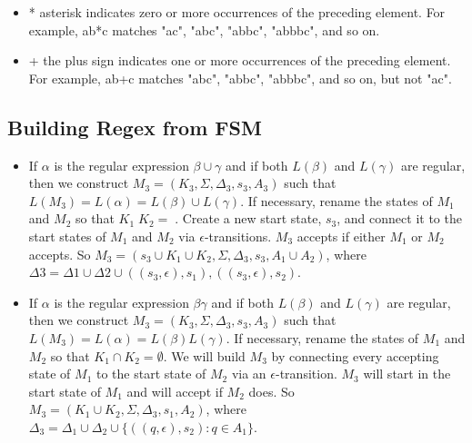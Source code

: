 \documentclass[hidelinks,12pt]{article}
\begin{document}
\begin{itemize}
    \item * asterisk indicates zero or more occurrences of the preceding element.
        For example, ab*c matches "ac", "abc", "abbc", "abbbc", and so on. 
    \item + the plus sign indicates one or more occurrences of the preceding element.
        For example, ab+c matches "abc", "abbc", "abbbc", and so on, but not "ac". 
\end{itemize}


\subsection{Building Regex from FSM}

\begin{itemize}

    \item If $\alpha$ is the regular expression $\beta \cup \gamma$ and if both $L(\beta)$ and $L(\gamma)$ are regular,
        then we construct $M_3 = (K_3, \Sigma, \Delta_3, s_3, A_3)$ such that $L(M_3) = L(\alpha) = L(\beta) \cup L(\gamma)$. If necessary, rename the states of $M_1$ and $M_2$ so that $K_1  K_2 = $. Create
        a new start state, $s_3$, and connect it to the start states of $M_1$ and $M_2$ via
        $\epsilon$-transitions. $M_3$ accepts if either $M_1$ or $M_2$ accepts. So $M_3 = ({s_3} \cup K_1 \cup K_2, \Sigma, \Delta_3, s_3, A_1 \cup A_2)$, where $\Delta3 = \Delta1 \cup \Delta2 \cup {((s_3, \epsilon), s_1), ((s_3, \epsilon), s_2)}$.

    \item If $\alpha$ is the regular expression $\beta\gamma$ and if both $L(\beta)$ and $L(\gamma)$ are regular, then
        we construct $M_3 = (K_3, \Sigma, \Delta_3, s_3, A_3)$ such that $L(M_3) = L(\alpha) = L(\beta) L(\gamma)$. If
        necessary, rename the states of $M_1$ and $M_2$ so that $K_1 \cap K_2 = \emptyset$. We will build $M_3$
        by connecting every accepting state of $M_1$ to the start state of $M_2$ via an
        $\epsilon$-transition. $M_3$ will start in the start state of $M_1$ and will accept if $M_2$
        does. So $M_3 = (K_1 \cup K_2, \Sigma, \Delta_3, s_1, A_2)$, where $\Delta_3 = \Delta_1 \cup \Delta_2 \cup \{((q, \epsilon), s_2) : q
        \in A_1\}$.


\end{itemize}
\end{document}

